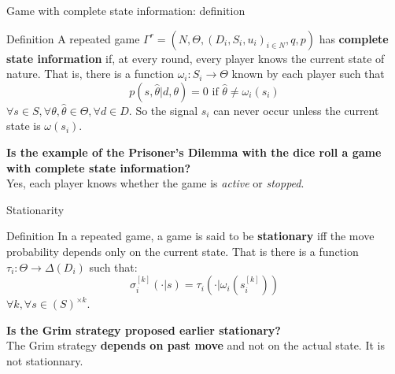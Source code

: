 \begin{frame}{Game with complete state information: definition}
    \begin{block}{Definition}
        A repeated game $\Gamma^r = (N,\Theta, (D_i,S_i,u_i)_{i\in N},q,p)$ has
        \textbf{complete state information} if, at every round, every player knows
        the current state of nature. That is, there is a function
        $\omega_i:S_i \rightarrow \Theta$ known by each player such that
        \begin{equation*}
            p(s,\hat{\theta} | d,\theta) = 0 \text{ if } \hat{\theta} \neq \omega_i(s_i)
        \end{equation*}
        $\forall s \in S, \forall \theta, \hat{\theta} \in \Theta, \forall d \in D$.
        So the signal $s_i$ can never occur unless the current state is $\omega(s_i)$.
    \end{block}

    \pause
    \textbf{{\color{green}Is the example of the Prisoner's Dilemma with the dice roll a game
    with complete state information?}} \\
    \pause
    Yes, each player knows whether the game is \textit{active} or \textit{stopped}.
\end{frame}

\begin{frame}{Stationarity}
    \begin{block}{Definition}
        In a repeated game, a game is said to be \textbf{stationary} iff the move probability
        depends only on the current state. That is there is a function $\tau_i : \Theta
        \rightarrow \Delta(D_i)$ such that:
        \begin{equation*}
	        \sigma_i^{[k]}(\cdot | s) = \tau_i(\cdot | \omega_i(s_i^{[k]}))
        \end{equation*}
        $\forall k, \forall s \in (S)^{\times k}$.
    \end{block}

    \pause
    \textbf{{\color{green}Is the Grim strategy proposed earlier stationary?}} \\
    \pause
    The Grim strategy \textbf{depends on past move} and not on the actual state. It
    is not stationnary.
\end{frame}


